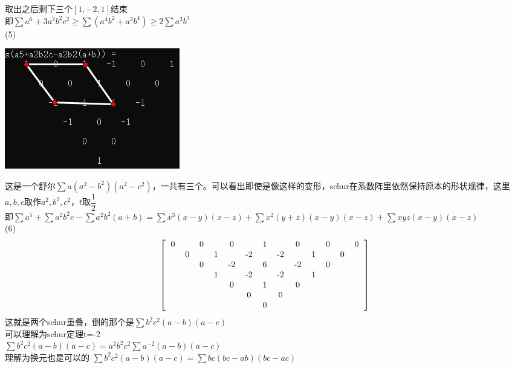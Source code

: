 \documentclass[UTF8]{ctexart}
\begin{document}
取出之后剩下三个$ [1,-2,1] $结束\\
即$\displaystyle  \sum  a^{6}+3 a^{2} b^{2} c^{2} \geq \displaystyle  \sum (a^{4}b^{2}+a^{2}b^{4}) \geq 2 \displaystyle  \sum  a^{3} b^{3}$\\
(5)\begin{center}
	\includegraphics[width=0.5\linewidth]{24}
\end{center}
这是一个舒尔$ \displaystyle  \sum a(a^{2}-b^{2})(a^{2}-c^{2}) $，一共有三个。可以看出即使是像这样的变形，schur在系数阵里依然保持原本的形状规律，这里$ a,b,c $取作$ a^{2},b^{2},c^{2} $，$ t $取$ \dfrac{1}{2} $\\
即$\displaystyle  \sum a^{5}+\displaystyle  \sum  a^{2} b^{2} c -\displaystyle  \sum a^{2} b^{2}(a+b)=\displaystyle  \sum x^{3}(x-y)(x-z)+\displaystyle  \sum x^{2}(y+z)(x-y)(x-z)+\displaystyle  \sum xyz(x-y)(x-z)$\\
(6)\renewcommand*{\arraystretch}{1.732}\[\left[\begin{matrix}
	\begin{tabular}{ccccccccccccc}
		0& &0& &0& &1& &0& &0& &0\\
		&0& &1& &-2& &-2& &1& &0&\\
		& &0& &-2& &6& &-2& &0& &\\
		& & &1& &-2& &-2& &1& & &\\
		& & & &0& &1& &0& & & &\\
		& & & & &0& &0& & & & &\\
		& & & & & &0& & & & & &\\
	\end{tabular}
\end{matrix}\right]\]
这就是两个schur重叠，倒的那个是$ \displaystyle  \sum b^{2}c^{2}(a-b)(a-c) $\\
可以理解为schur定理t=-2\\
$\displaystyle  \sum  b^{2} c^{2}(a-b)(a-c)=a^{2} b^{2} c^{2} \displaystyle  \sum  a^{-2}(a-b)(a-c) $\\
理解为换元也是可以的
$\displaystyle  \sum b^{2} c^{2}(a-b)(a-c)=\displaystyle  \sum b c(b c-a b)(b c-a c)$\\
\end{document}
